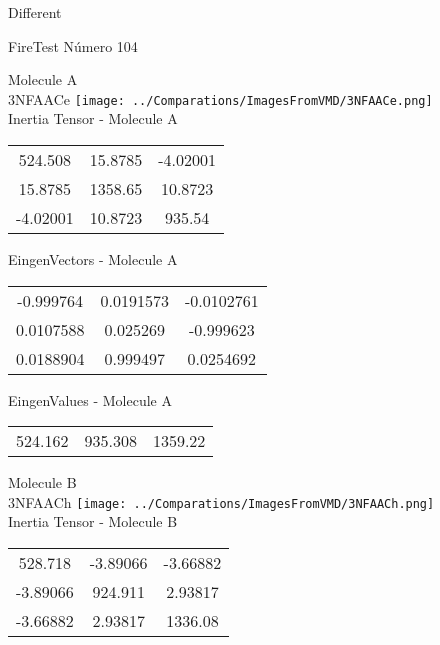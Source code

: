 \begin{center}
\vtab
\vtab
\textcolor{NavyBlue}{\Large Different}
\end{center}

 \newpage

\vtab[-2cm]
\begin{center}
{\large FireTest \tab Número 104}
\end{center}
\begin{multicols}{2}
\begin{center}

Molecule A \\ 
3NFAACe
\texttt{[image: ../Comparations/ImagesFromVMD/3NFAACe.png]}
\\
Inertia Tensor - Molecule A \\
\vtab

\begin{tabular}{|c c c|}
524.508	 & 	15.8785	 & 	-4.02001	 \\
15.8785	 & 	1358.65	 & 	10.8723	 \\
-4.02001	 & 	10.8723	 & 	935.54
\end{tabular}

\vtab
 EingenVectors - Molecule A     \\
\vtab
\begin{tabular}{|c c c|}
-0.999764	 & 	0.0191573	 & 	-0.0102761	 \\
0.0107588	 & 	0.025269	 & 	-0.999623	 \\
0.0188904	 & 	0.999497	 & 	0.0254692
\end{tabular}

\vtab
 EingenValues - Molecule A     \\
\vtab
\begin{tabular}{|c c c|}
524.162	 & 	935.308	 & 	1359.22	 \\
\end{tabular}
\columnbreak

Molecule B \\ 
3NFAACh
\texttt{[image: ../Comparations/ImagesFromVMD/3NFAACh.png]}
\\
Inertia Tensor - Molecule B \\
\vtab

\begin{tabular}{|c c c|}
528.718	 & 	-3.89066	 & 	-3.66882	 \\
-3.89066	 & 	924.911	 & 	2.93817	 \\
-3.66882	 & 	2.93817	 & 	1336.08
\end{tabular}


\end{center}
\end{multicols}
